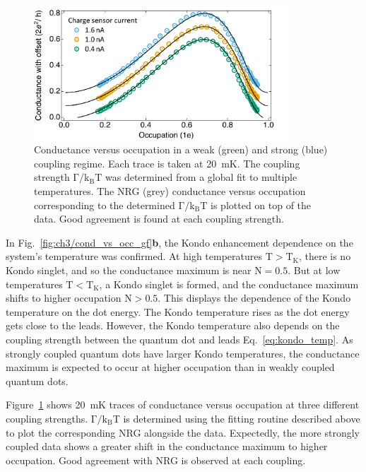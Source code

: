 \begin{figure}[!hbt]
 \begin{center}
 \includegraphics[width=0.85\textwidth]{figures/ch3/figure15.pdf}
 \caption[Conductance versus Occupation : Varying Coupling Strength]{\label{fig:ch3/cond_occ_couplingstrength} 
 Conductance versus occupation in a weak (green) and strong (blue) coupling regime. Each trace is taken at \qty{20}{mK}. The coupling strength $\mathrm{\Gamma/k_BT}$ was determined from a global fit to multiple temperatures. The NRG (grey) conductance versus occupation corresponding to the determined $\mathrm{\Gamma/k_BT}$ is plotted on top of the data. Good agreement is found at each coupling strength.}
 \end{center}
\end{figure}


In Fig.~\ref{fig:ch3/cond_vs_occ_gf}\textbf{b}, the Kondo enhancement dependence on the system's temperature was confirmed. At high temperatures $\mathrm{T>T_K}$, there is no Kondo singlet, and so the conductance maximum is near $\mathrm{N} = 0.5$. But at low temperatures $\mathrm{T<T_K}$, a Kondo singlet is formed, and the conductance maximum shifts to higher occupation $\mathrm{N} > 0.5$. This displays the dependence of the Kondo temperature on the dot energy. The Kondo temperature rises as the dot energy gets close to the leads. However, the Kondo temperature also depends on the coupling strength between the quantum dot and leads Eq.~\ref{eq:kondo_temp}. As strongly coupled quantum dots have larger Kondo temperatures, the conductance maximum is expected to occur at higher occupation than in weakly coupled quantum dots. 



Figure~\ref{fig:ch3/cond_occ_couplingstrength} shows \qty{20}{mK} traces of conductance versus occupation at three different coupling strengths. $\mathrm{\Gamma/k_BT}$ is determined using the fitting routine described above to plot the corresponding NRG alongside the data. Expectedly, the more strongly coupled data shows a greater shift in the conductance maximum to higher occupation. Good agreement with NRG is observed at each coupling.






